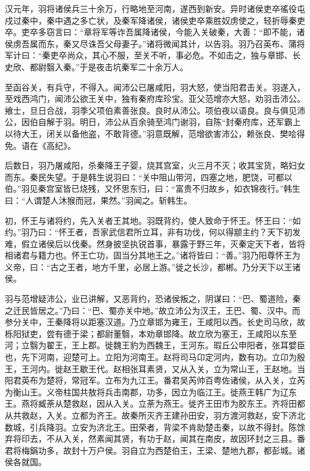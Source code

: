 \documentclass[12pt,UTF8]{ctexbook}
\begin{document}
汉元年，羽将诸侯兵三十余万，行略地至河南，遂西到新安。异时诸侯吏卒徭役屯戍过秦中，秦中遇之多亡状，及秦军降诸侯，诸侯吏卒乘胜奴虏使之，轻折辱秦吏卒。吏卒多窃言曰：“章将军等诈吾属降诸侯，今能入关破秦，大善：“即不能，诸侯虏吾属而东，秦又尽诛吾父母妻子。”诸将微闻其计，以告羽。羽乃召英布、蒲将军计曰：“秦吏卒尚众，其心不服，至关不听，事必危。不如击之，独与章邯、长史欣、都尉翳入秦。”于是夜击坑秦军二十余万人。



至函谷关，有兵守，不得入。闻沛公已屠咸阳，羽大怒，使当阳君击关。羽遂入，至戏西鸿门，闻沛公欲王关中，独有秦府库珍宝。亚父范增亦大怒，劝羽击沛公。飨士，旦日合战，羽季父项伯素善张良。良时从沛公。项伯夜以语良。良与俱见沛公，因伯自解于羽。明日，沛公从百余骑至鸿门谢羽，自陈“封秦府库，还军霸上以待大王，闭关以备他盗，不敢背德。”羽意既解，范增欲害沛公，赖张良、樊哙得免。语在《高纪》。



后数日，羽乃屠咸阳，杀秦降王子婴，烧其宫室，火三月不灭；收其宝货，略妇女而东。秦民失望。于是韩生说羽曰：“关中阻山带河，四塞之地，肥饶，可都以伯。”羽见秦宫室皆已烧残，又怀思东归，曰：“富贵不归故乡，如衣锦夜行。”韩生曰：“人谓楚人沐猴而冠，果然。”羽闻之。斩韩生。



初，怀王与诸将约，先入关者王其地。羽既背约，使人致命于怀王。怀王曰：“如约。”羽乃曰：“怀王者，吾家武信君所立耳，非有功伐，何以得颛主约？天下初发难，假立诸侯后以伐秦。然身披坚执锐首事，暴露于野三年，灭秦定天下者，皆将相诸君与籍力也。怀王亡功，固当分其地王之。”诸将皆曰：“善。”羽乃阳尊怀王为义帝，曰：“古之王者，地方千里，必居上游。”徙之长沙，都郴。乃分天下以王诸侯。



羽与范增疑沛公，业已讲解，又恶背约，恐诸侯叛之，阴谋曰：“巴、蜀道险，秦之迁民皆居之。”乃曰：“巴、蜀亦关中地。”故立沛公为汉王，王巴、蜀、汉中。而参分关中，王秦降将以距塞汉道。乃立章邯为雍王，王咸阳以西。长史司马欣，故栎阳狱吏，尝有德于梁；都尉董翳，本劝章邯降。故立欣为塞王，王咸阳以东至河；立翳为翟王，王上郡。徙魏王豹为西魏王，王河东。瑕丘公申阳者，张耳嬖臣也，先下河南，迎楚可上。立阳为河南王。赵将司马卬定河内，数有功。立卬为殷王，王河内。徙赵王歇王代。赵相张耳素贤，又从入关，立为常山王，王赵地。当阳君英布为楚将，常冠军。立布为九江王。番君吴芮帅百粤佐诸侯，从入关，立芮为衡山王。义帝柱国共敖将兵击南郡，功多，因立为临江王。徙燕王韩广为辽东王。燕将臧荼从楚救赵，因从入关。立荼为燕王。徙齐王田市为胶东王。齐将田都从共救赵，入关。立都为齐王。故秦所灭齐王建孙田安，羽方渡河救赵，安下济北数城，引兵降羽。立安为济北王。田荣者，背梁不肯助楚击秦，以故不得封。陈馀弃将印去，不从入关，然素闻其贤，有功于赵，闻其在南皮，故因环封之三县。番君将梅鋗功多，故封十万户侯。羽自立为西楚伯王，王梁、楚地九郡，都彭城。诸侯各就国。
\end{document}
